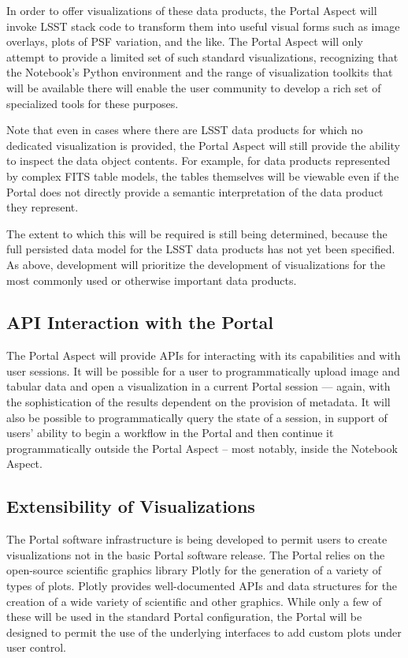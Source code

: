 In order to offer visualizations of these data products, the Portal Aspect will invoke LSST stack code to transform them into useful visual forms such as image overlays, plots of PSF variation, and the like.
The Portal Aspect will only attempt to provide a limited set of such standard visualizations, recognizing that the Notebook's Python environment and the range of visualization toolkits that will be available there will enable the user community to develop a rich set of specialized tools for these purposes.

Note that even in cases where there are LSST data products for which no dedicated visualization is provided, the Portal Aspect will still provide the ability to inspect the data object contents.
For example, for data products represented by complex FITS table models, the tables themselves will be viewable even if the Portal does not directly provide a semantic interpretation of the data product they represent.

The extent to which this will be required is still being determined, because the full persisted data model for the LSST data products has not yet been specified.
As above, development will prioritize the development of visualizations for the most commonly used or otherwise important data products.

\subsection{API Interaction with the Portal}\label{api-interaction-portal}

The Portal Aspect will provide APIs for interacting with its capabilities and with user sessions.
It will be possible for a user to programmatically upload image and tabular data and open a visualization in a current Portal session --- again, with the sophistication of the results dependent on the provision of metadata.
It will also be possible to programmatically query the state of a session, in support of users' ability to begin a workflow in the Portal and then continue it programmatically outside the Portal Aspect -- most notably, inside the Notebook Aspect.

\subsection{Extensibility of Visualizations}\label{extensibility-of-visualizations}

The Portal software infrastructure is being developed to permit users to create visualizations not in the basic Portal software release.
The Portal relies on the open-source scientific graphics library Plotly for the generation of a variety of types of plots.
Plotly provides well-documented APIs and data structures for the creation of a wide variety of scientific and other graphics.
While only a few of these will be used in the standard Portal configuration, the Portal will be designed to permit the use of the underlying interfaces to add custom plots under user control.

